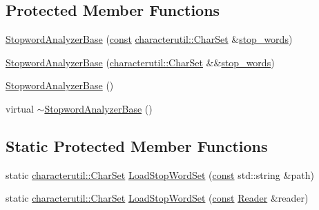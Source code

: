 \subsection*{Protected Member Functions}
\begin{DoxyCompactItemize}
\item 
\mbox{\hyperlink{classlucene_1_1core_1_1analysis_1_1StopwordAnalyzerBase_a07e1b2362b8ac3776cf456250884f898}{Stopword\+Analyzer\+Base}} (\mbox{\hyperlink{ZlibCrc32_8h_a2c212835823e3c54a8ab6d95c652660e}{const}} \mbox{\hyperlink{classlucene_1_1core_1_1analysis_1_1characterutil_1_1CharSet}{characterutil\+::\+Char\+Set}} \&\mbox{\hyperlink{classlucene_1_1core_1_1analysis_1_1StopwordAnalyzerBase_a12ceda198e84aabe357ccd7b28e66d07}{stop\+\_\+words}})
\item 
\mbox{\hyperlink{classlucene_1_1core_1_1analysis_1_1StopwordAnalyzerBase_ab15b0a23b58e1d09b2d65338349f0260}{Stopword\+Analyzer\+Base}} (\mbox{\hyperlink{classlucene_1_1core_1_1analysis_1_1characterutil_1_1CharSet}{characterutil\+::\+Char\+Set}} \&\&\mbox{\hyperlink{classlucene_1_1core_1_1analysis_1_1StopwordAnalyzerBase_a12ceda198e84aabe357ccd7b28e66d07}{stop\+\_\+words}})
\item 
\mbox{\hyperlink{classlucene_1_1core_1_1analysis_1_1StopwordAnalyzerBase_a94f2df7bf83363d5690e925c3140157d}{Stopword\+Analyzer\+Base}} ()
\item 
virtual \mbox{\hyperlink{classlucene_1_1core_1_1analysis_1_1StopwordAnalyzerBase_a464b01561952e4244b31df0a61045d63}{$\sim$\+Stopword\+Analyzer\+Base}} ()
\end{DoxyCompactItemize}
\subsection*{Static Protected Member Functions}
\begin{DoxyCompactItemize}
\item 
static \mbox{\hyperlink{classlucene_1_1core_1_1analysis_1_1characterutil_1_1CharSet}{characterutil\+::\+Char\+Set}} \mbox{\hyperlink{classlucene_1_1core_1_1analysis_1_1StopwordAnalyzerBase_a72330e7251da134ad13afdf181c1f04a}{Load\+Stop\+Word\+Set}} (\mbox{\hyperlink{ZlibCrc32_8h_a2c212835823e3c54a8ab6d95c652660e}{const}} std\+::string \&path)
\item 
static \mbox{\hyperlink{classlucene_1_1core_1_1analysis_1_1characterutil_1_1CharSet}{characterutil\+::\+Char\+Set}} \mbox{\hyperlink{classlucene_1_1core_1_1analysis_1_1StopwordAnalyzerBase_ab768bf79e306a74d72ecfea48080018f}{Load\+Stop\+Word\+Set}} (\mbox{\hyperlink{ZlibCrc32_8h_a2c212835823e3c54a8ab6d95c652660e}{const}} \mbox{\hyperlink{classlucene_1_1core_1_1analysis_1_1Reader}{Reader}} \&reader)
\end{DoxyCompactItemize}
